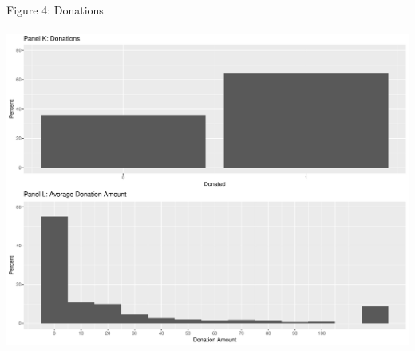 \documentclass[12pt]{article}
\begin{document}
\noindent Figure 4: Donations\\ \\
\includegraphics[scale=0.35]{Figure4.pdf}\\
\end{document}
